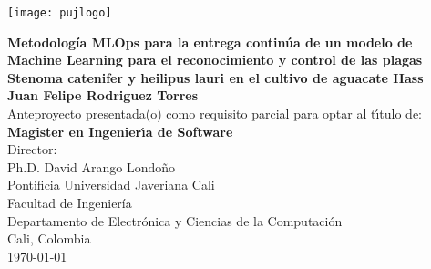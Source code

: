 \begin{center}
\thispagestyle{empty}
\vspace*{0cm}
\begin{center}
    \texttt{[image: pujlogo]}~\\[1.75cm]
\end{center}
\textbf{\fontsize{11}{12}\selectfont
Metodología MLOps para la entrega continúa de un modelo de Machine Learning para el reconocimiento y control de las plagas Stenoma catenifer y heilipus lauri en el cultivo de aguacate Hass}\\[1.75cm]
\normalsize\textbf{Juan Felipe Rodriguez Torres}\\[1.5cm]
\small Anteproyecto presentada(o) como requisito parcial para optar al
t\'{\i}tulo de:\\
\textbf{Magister en Ingenier\'{\i}a de Software}\\[1.5cm]
Director:\\
Ph.D. David Arango Londoño\\[1.6cm]

Pontificia Universidad Javeriana Cali\\
Facultad de Ingeniería\\
Departamento de Electrónica y Ciencias de la Computación\\
Cali, Colombia\\
\today\\
\end{center}
